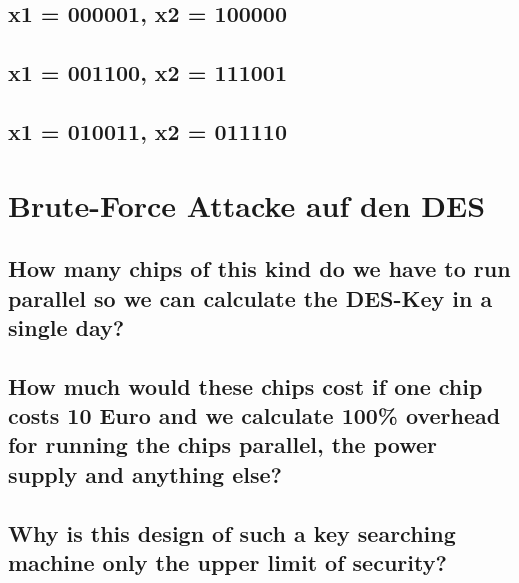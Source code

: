 \subsection{x1 = 000001, x2 = 100000}
\label{section:4a}

\subsection{x1 = 001100, x2 = 111001}
\label{section:4b}

\subsection{x1 = 010011, x2 = 011110}
\label{section:4c}


\section{Brute-Force Attacke auf den DES}

\begin{comment}
An often used method to evaluate the security of an symmetric encryption algorithm against a bruteforce
attack is the calculation of the costs of constructing a key search machine. In the next exercise
we will have a look at this thematic.
Consider a DES-chip with internal parallel hardware structure that can perform a DES-encryption in
a single cycle(So it can test one key per cycle). We further assume that we can run the chips with a
frequency of 126 MHz.
\end{comment}

\subsection{How many chips of this kind do we have to run parallel so we can calculate the DES-Key in a single day?}
\label{section:5a}

\subsection{How much would these chips cost if one chip costs 10 Euro and we calculate 100\% overhead for running the chips parallel, the power supply and anything else?}
	\label{section:5b}
	
\subsection{Why is this design of such a key searching machine only the upper limit of security?}
\label{section:5c}


